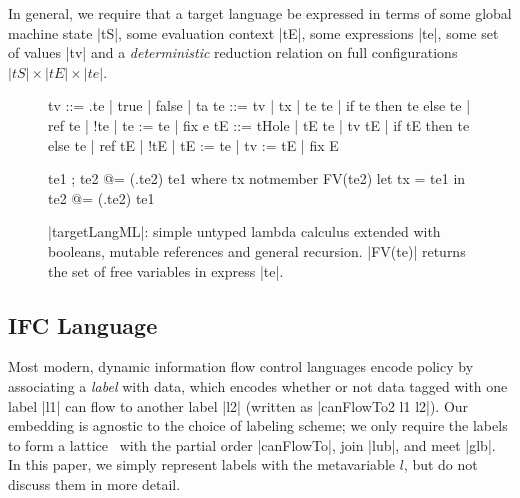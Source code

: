 In general, we require that a target language be expressed in terms
of some global machine state |tS|, some evaluation context |tE|,
some expressions |te|, some set of values |tv| and a \emph{deterministic}
reduction relation on full configurations $|tS| \times |tE| \times |te|$.

\begin{figure}
\begin{code}
tv   ::= \tx.te | true | false | ta
te   ::= tv | tx | te te | if te then te else te
       | ref te | !te | te := te | fix e
tE   ::= tHole | tE te | tv tE | if tE then te else te
       | ref tE | !tE | tE := te | tv := tE | fix E

te1 ; te2            @= (\tx.te2) te1  where  tx notmember FV(te2)
let tx = te1 in te2  @= (\tx.te2) te1
\end{code}


\caption{|targetLangML|: simple untyped lambda calculus extended with booleans,
mutable references and general recursion. |FV(te)| returns the set of free
variables in express |te|.}
\label{fig:ml}
\end{figure}

\subsection{IFC Language}

Most modern, dynamic information flow control languages encode
policy by associating a \emph{label}
with data, which encodes whether or not data tagged with one
label |l1| can flow to another label |l2| (written as |canFlowTo2 l1 l2|).
Our embedding is agnostic to the choice of labeling scheme; we only
require the labels to form a lattice~\cite{Denning:1976:LMS:360051.360056}
with the partial order |canFlowTo|, join |lub|, and meet |glb|.
In this paper, we simply represent labels with the metavariable
$l$, but do not discuss them in more detail.

